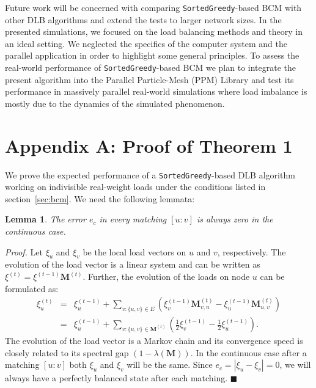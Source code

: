 \documentclass[12pt,psfig,a4]{article}
\newcommand{\sg}{\texttt{SortedGreedy}}
\newtheorem{mylemma}{Lemma}
\theoremstyle{plain}
\begin{document}
Future work will be concerned with comparing \sg{}-based BCM with other DLB algorithms and extend the tests to larger network sizes. 
In the presented simulations, we focused on the load balancing methods and theory in an ideal setting. We neglected the specifics of the computer system and the parallel application in order to highlight some general principles. To assess the real-world performance of \sg{}-based BCM we plan to integrate the present algorithm into the Parallel Particle-Mesh (PPM) Library \cite{sbalzarini2006ppm,sbalzarini2010abstractions,awile2010toward,awile2013domain} and test its performance in massively parallel real-world simulations where load imbalance is mostly due to the dynamics of the simulated phenomenon. 


\newpage

\newpage

\section{Appendix A: Proof of Theorem 1}
\label{sec:proof}
We prove the expected performance of a \sg{}-based DLB algorithm working on indivisible real-weight loads under the conditions listed in section~\ref{sec:bcm}. We need the following lemmata:
\begin{mylemma}
\label{lemma:e_c}
The error $e_c$ in every matching $[u:v]$ is always zero in the \textit{continuous} case.
\end{mylemma}

\textit{Proof.} Let $\xi_u$ and $\xi_v$ be the local load vectors on $u$ and $v$, respectively. The evolution of the load vector is a linear system and can be written as $\xi^{(t)} = \xi^{(t-1)}\mathbf{M}^{(t)}$. Further, the evolution of the loads on node $u$ can be formulated as:
\begin{eqnarray}
	 \xi_{u}^{(t)}  &=&\xi_u^{(t-1)}+ \sum_{v: \{u,v\}\in E} \left (\xi_v^{(t-1)} \mathbf{M}_{v,u}^{(t)} - \xi_u^{(t-1)} \mathbf{M}_{u,v}^{(t)}  \right ) \\
	 		   &= &\xi_u^{(t-1)}+ \sum_{v: \{u,v\}\in \mathbf{M}^{(t)}} \left ( \frac{1}{2} \xi_v^{(t-1)} - \frac{1}{2} \xi_u^{(t-1)} \right ) .
\end{eqnarray}
The evolution of the load vector is a Markov chain and its convergence speed is closely related to its spectral gap $(1-\lambda (\mathbf{M}))$. In the continuous case after a matching $[u:v]$ both $\xi_u$ and $\xi_v$ will be the same. Since $e_c=|\xi_u-\xi_v|=0$, we will always have a perfectly balanced state after each matching. $\blacksquare$
\end{document}
